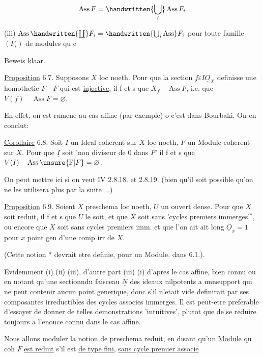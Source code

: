 \[
 \operatorname{Ass}F=\handwritten{\bigcup_i}\operatorname{Ass}F_i
\]

(iii) $\operatorname{Ass}\handwritten{\coprod} F_i=\handwritten{\bigcup_i\operatorname{Ass}}F_i$ \qquad pour toute famille $(F_i)$ de modules qu c

Beweis klaar.

\uline{Proposition} 6.7. \quad Supposons $X$ loc noeth. Pour que la section $f\varepsilon I\underline O_X$ definisse une homothetie $F\quad F$ qui est \uline{injective}, il f et s que $X_f\quad\operatorname{Ass}F$, i.e. que $V(f)\quad\operatorname{Ass}F=\varnothing$.

En effet, on est ramene au cas affine (par exemple) o c'est dans Bourbaki. On en conclut:

\uline{Corollaire} 6.8. \quad Soit $I$ un Ideal coherent sur $X$ loc noeth, $F$ un Module coherent sur $X$. Pour que $\underline I$ soit 'non diviseur de 0 dans $F$' il f et s que $V(I)\quad\operatorname{Ass}\unsure{\mathbb F|F}=\varnothing$.

On peut mettre ici si on veut IV 2.8.18. et 2.8.19. (bien qu'il soit possible qu'on ne les utilisera plus par la suite ...)

\uline{Proposition} 6.9. \quad Soient $X$ preschema loc noeth, $U$ un ouvert dense. Pour que $X$ soit reduit, il f et s que $U$ le soit, et que $X$ soit sans 'cycles premiers immerges'$^*$, ou encore que $X$ soit sans cycles premiers imm. et que l'on ait \quad ait long $\underline O_x=1$ pour $x$ point gen d'une comp irr de $X$.

(Cette notion * devrait etre definie, pour un Module, dans 6.1.).

Evidemment (i) \quad (ii) \quad (iii), d'autre part (iii) \quad (i)  d'apres le cas affine, bien connu  ou en notant qu'une sectionndu faisceau $\underline N$ des ideaux nilpotents a unnsupport qui ne peut contenir aucun point generique, donc s'il n'etait vide definirait par ses composantes irreductibles des cycles associes immerges. Il est peut-etre preferable d'essayer de donner  de telles demonstrations 'intuitives', plutot que de se reduire toujours a l'enonce connu dans le cas affine.

Nous allons moduler la notion de preschema reduit, en disant qu'un \uline{Module} qu coh $F$ \uline{est reduit} s'il est \uline{de type fini}, \uline{sans cycle premier associe}
